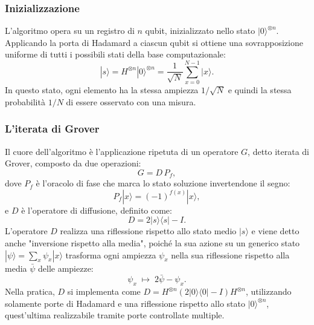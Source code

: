 \subsubsection{Inizializzazione}
L'algoritmo opera su un registro di $n$ qubit, inizializzato nello stato $|0\rangle^{\otimes n}$. Applicando la porta di Hadamard a ciascun qubit si ottiene una sovrapposizione uniforme di tutti i possibili stati della base computazionale:
\begin{equation}
  |s\rangle = H^{\otimes n}|0\rangle^{\otimes n} = \frac{1}{\sqrt{N}}\sum_{x = 0}^{N - 1}|x\rangle.
\end{equation}
In questo stato, ogni elemento ha la stessa ampiezza $1/\sqrt{N}$ e quindi la stessa probabilità $1/N$ di essere osservato con una misura.
\subsubsection{L'iterata di Grover}
Il cuore dell'algoritmo è l'applicazione ripetuta di un operatore $G$, detto iterata di Grover, composto da due operazioni:
\begin{equation}
  G = D \, P_f,
\end{equation}
dove $P_f$ è l'oracolo di fase che marca lo stato soluzione invertendone il segno:
\begin{equation}
  P_f|x\rangle = (-1)^{f(x)}|x\rangle,
\end{equation}
e $D$ è l'operatore di diffusione, definito come:
\begin{equation}
  D = 2|s\rangle\langle s| - I.
\end{equation}
L'operatore $D$ realizza una riflessione rispetto allo stato medio $|s\rangle$ e viene detto anche "inversione rispetto alla media", poiché la sua azione su un generico stato $|\psi\rangle = \sum_x \psi_x |x\rangle$ trasforma ogni ampiezza $\psi_x$ nella sua riflessione rispetto alla media $\bar{\psi}$ delle ampiezze:
\begin{equation}
  \psi_x \; \longmapsto \; 2\bar{\psi} - \psi_x.
\end{equation}
Nella pratica, $D$ si implementa come $D = H^{\otimes n}(2|0\rangle\langle 0| - I)H^{\otimes n}$, utilizzando solamente porte di Hadamard e una riflessione rispetto allo stato $|0\rangle^{\otimes n}$, quest'ultima realizzabile tramite porte controllate multiple.
